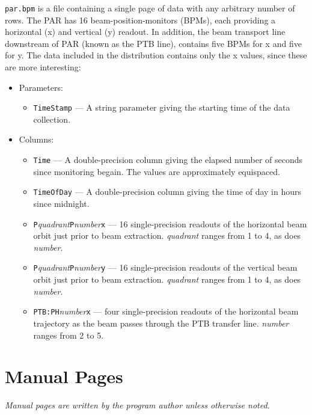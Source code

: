 \documentclass[11pt]{article}
\begin{document}
{\tt par.bpm} is a file containing a single page of data with any arbitrary
number of rows.  The PAR has 16 beam-position-monitors (BPMs), each
providing a horizontal (x) and vertical (y) readout.  In addition, the beam
transport line downstream of PAR (known as the PTB line), contains five
BPMs for x and five for y.  The data included in the distribution contains
only the x values, since these are more interesting:
\begin{itemize}
\item Parameters: 
        \begin{itemize}
        \item {\tt TimeStamp} --- A string parameter giving the starting time of the data collection.
        \end{itemize}
\item Columns:
        \begin{itemize}
        \item \verb|Time| --- A double-precision column giving the elapsed number of seconds since monitoring
        begain. The values are approximately equispaced.
        \item \verb|TimeOfDay| --- A double-precision column giving the time of day in hours since midnight.
        \item \verb|P|{\em quadrant}\verb|P|{\em number}\verb|x| --- 16 single-precision 
        readouts of the horizontal beam orbit just prior
        to beam extraction.  {\em quadrant} ranges from 1 to 4, as does {\em number}.
        \item \verb|P|{\em quadrant}\verb|P|{\em number}\verb|y| --- 16 single-precision 
        readouts of the vertical beam orbit just prior
        to beam extraction.  {\em quadrant} ranges from 1 to 4, as does {\em number}.
        \item \verb|PTB:PH|{\em number}\verb|x| --- four single-precision readouts of the
        horizontal beam trajectory as the beam passes
        through the PTB transfer line.  {\em number} ranges from 2 to 5.
        \end{itemize}
\end{itemize}

\newpage
\section{Manual Pages}
\begin{center}
{\em Manual pages are written by the program author unless otherwise noted.}
\end{center}
\end{document}
